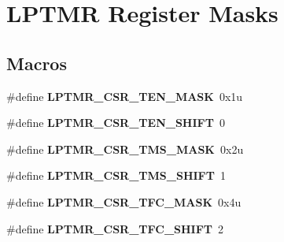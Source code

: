 \hypertarget{group___l_p_t_m_r___register___masks}{}\section{L\+P\+T\+M\+R Register Masks}
\label{group___l_p_t_m_r___register___masks}
\subsection*{Macros}
\begin{DoxyCompactItemize}
\item 
\hypertarget{group___l_p_t_m_r___register___masks_ga4ed197f1cb8d0e954324b4854ff14a83}{}\#define {\bfseries L\+P\+T\+M\+R\+\_\+\+C\+S\+R\+\_\+\+T\+E\+N\+\_\+\+M\+A\+S\+K}~0x1u\label{group___l_p_t_m_r___register___masks_ga4ed197f1cb8d0e954324b4854ff14a83}

\item 
\hypertarget{group___l_p_t_m_r___register___masks_gada00f24f79b11a91e8404b4531d66733}{}\#define {\bfseries L\+P\+T\+M\+R\+\_\+\+C\+S\+R\+\_\+\+T\+E\+N\+\_\+\+S\+H\+I\+F\+T}~0\label{group___l_p_t_m_r___register___masks_gada00f24f79b11a91e8404b4531d66733}

\item 
\hypertarget{group___l_p_t_m_r___register___masks_ga57ee593a57d844d7bb4b87c127765558}{}\#define {\bfseries L\+P\+T\+M\+R\+\_\+\+C\+S\+R\+\_\+\+T\+M\+S\+\_\+\+M\+A\+S\+K}~0x2u\label{group___l_p_t_m_r___register___masks_ga57ee593a57d844d7bb4b87c127765558}

\item 
\hypertarget{group___l_p_t_m_r___register___masks_gaeac406c6a48e15c6ec5784fb891b51b6}{}\#define {\bfseries L\+P\+T\+M\+R\+\_\+\+C\+S\+R\+\_\+\+T\+M\+S\+\_\+\+S\+H\+I\+F\+T}~1\label{group___l_p_t_m_r___register___masks_gaeac406c6a48e15c6ec5784fb891b51b6}

\item 
\hypertarget{group___l_p_t_m_r___register___masks_gaca581598c0f319b0002deda730479842}{}\#define {\bfseries L\+P\+T\+M\+R\+\_\+\+C\+S\+R\+\_\+\+T\+F\+C\+\_\+\+M\+A\+S\+K}~0x4u\label{group___l_p_t_m_r___register___masks_gaca581598c0f319b0002deda730479842}

\item 
\hypertarget{group___l_p_t_m_r___register___masks_gaee3d1b59f30f6217f1f74b18cf973c4a}{}\#define {\bfseries L\+P\+T\+M\+R\+\_\+\+C\+S\+R\+\_\+\+T\+F\+C\+\_\+\+S\+H\+I\+F\+T}~2\label{group___l_p_t_m_r___register___masks_gaee3d1b59f30f6217f1f74b18cf973c4a}


\end{DoxyCompactItemize}
